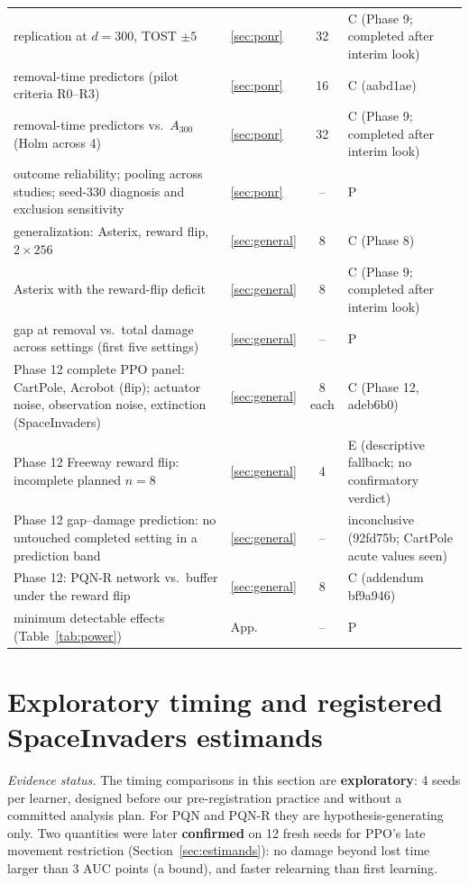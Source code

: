 \documentclass[10pt]{article} %
\begin{document}
\begin{table}[t]
{\begin{tabular}{llcl}
replication at $d=300$, TOST $\pm5$ & \ref{sec:ponr} & 32 & C (Phase 9; completed after interim look) \\
removal-time predictors (pilot criteria R0--R3) & \ref{sec:ponr} & 16 & C (aabd1ae) \\
removal-time predictors vs.\ $A_{300}$ (Holm across 4) & \ref{sec:ponr} & 32 & C (Phase 9; completed after interim look) \\
outcome reliability; pooling across studies; seed-330 diagnosis and exclusion sensitivity & \ref{sec:ponr} & -- & P \\
generalization: Asterix, reward flip, $2\times256$ & \ref{sec:general} & 8 & C (Phase 8) \\
Asterix with the reward-flip deficit & \ref{sec:general} & 8 & C (Phase 9; completed after interim look) \\
gap at removal vs.\ total damage across settings (first five settings) & \ref{sec:general} & -- & P \\
Phase 12 complete PPO panel: CartPole, Acrobot (flip); actuator noise, observation noise, extinction (SpaceInvaders) & \ref{sec:general} & 8 each & C (Phase 12, adeb6b0) \\
Phase 12 Freeway reward flip: incomplete planned $n=8$ & \ref{sec:general} & 4 & E (descriptive fallback; no confirmatory verdict) \\
Phase 12 gap--damage prediction: no untouched completed setting in a prediction band & \ref{sec:general} & -- & inconclusive (92fd75b; CartPole acute values seen) \\
Phase 12: PQN-R network vs.\ buffer under the reward flip & \ref{sec:general} & 8 & C (addendum bf9a946) \\
minimum detectable effects (Table~\ref{tab:power}) & App. & -- & P \\
\bottomrule
\end{tabular}}
\end{table}

\section{Exploratory timing and registered SpaceInvaders estimands}\label{sec:timing}

\noindent\textit{Evidence status.} The timing comparisons in this section are \textbf{exploratory}: 4 seeds per learner, designed before our pre-registration practice and without a committed analysis plan. For PQN and PQN-R they are hypothesis-generating only. Two quantities were later \textbf{confirmed} on 12 fresh seeds for PPO's late movement restriction (Section~\ref{sec:estimands}): no damage beyond lost time larger than 3 AUC points (a bound), and faster relearning than first learning.
\end{document}

